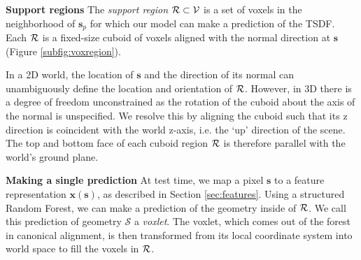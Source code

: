 \documentclass[10pt,twocolumn,letterpaper]{article}
\makeatletter
\renewcommand*{\ie}{i.e.\@\xspace}
\newcommand{\feat}{\mathbf{x}}
\newcommand{\rgbdimage}{\mathcal{D}}
\newcommand{\pixelidx}{\mathbf{s}}
\newcommand{\voxelgrid}{\mathcal{V}}
\newcommand{\project}{\mathbf{p}}
\newcommand{\point}{\mathbf{p}}
\newcommand{\normal}{\mathbf{n}}
\newcommand{\updir}{\mathbf{u}}
\newcommand{\todo}[1]{\textcolor{red}{TODO: #1}}
\newcommand{\remove}[1]{\textcolor{grey}{#1}}
\renewcommand{\paragraph}{\vspace{2pt}\noindent\textbf}
\makeatother
\begin{document}
\paragraph{Support regions}
The \emph{support region} $\voxregion \subset \voxelgrid$ is a set of voxels in the neighborhood of $\pixelidx_p$ for which our model can make a prediction of the TSDF.
Each $\mathcal{R}$ is a fixed-size cuboid of voxels aligned with the normal direction at $\pixelidx$ (Figure \ref{subfig:voxregion}).

In a 2D world, the location of $\pixelidx$ and the direction of its normal can unambiguously define the location and orientation of $\mathcal{R}$.
However, in 3D there is a degree of freedom unconstrained as the rotation of the cuboid about the axis of the normal is unspecified.
We resolve this by aligning the cuboid such that its z direction is coincident with the world z-axis, \ie the `up' direction of the scene.
The top and bottom face of each cuboid region $\mathcal{R}$ is therefore parallel with the world's ground plane.




\paragraph{Making a single prediction}
At test time, we map a pixel $\pixelidx$ to a feature representation $\feat(\pixelidx)$, as described in Section \ref{sec:features}.
Using a structured Random Forest, we can make a prediction of the geometry inside of $\mathcal{R}$.
We call this prediction of geometry $\mathcal{S}$ a \emph{voxlet}.
The voxlet, which comes out of the forest in canonical alignment, is then transformed from its local coordinate system into world space to fill the voxels in $\mathcal{R}$.
\end{document}
